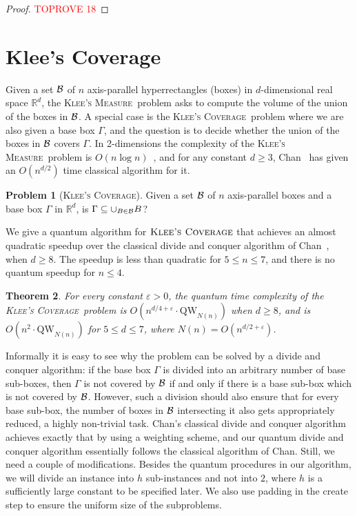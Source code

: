 \documentclass[12pt]{article}
\newcommand{\qw}{\mathrm{QW}}
\newcommand{\R}{\mathbb{R}}
\newcommand{\KCf}{\textsc{Klee's Coverage}}
\newcommand{\KMf}{\textsc{Klee's Measure}}
\newtheorem{theorem}{Theorem}
\theoremstyle{definition}
\newtheorem{problem}[theorem]{Problem}
\begin{document}
\begin{proof}\textcolor{red}{TOPROVE 18}\end{proof}

\section{Klee's Coverage}
\label{sec:klee}

Given a set $\cal B$ of $n$ axis-parallel hyperrectangles (boxes) in $d$-dimensional real space $\R^d$, the \KMf \ problem asks to compute the volume of the union of the boxes in $\cal B$. A special case is the \KCf \ problem where we are also given a base box $\Gamma$, and the question is to decide whether the union of the boxes in $\cal B$ covers $\Gamma$. 
In 2-dimensions the complexity of the \KMf \  problem is $O(n \log n)$~\cite{Klee77}, and for any constant $d \geq 3$,
Chan~\cite{Chan13} has given an $O(n^{d/2})$ time classical algorithm for it.


\begin{problem}[\KCf ]
Given a set $\cal B$ of $n$ axis-parallel boxes and a base box $\Gamma$ in $\R^d$, is $\Gamma \subseteq \cup_{B \in {\cal B}} B$?
\end{problem}

We give a quantum algorithm for $\KCf$ that achieves an almost quadratic speedup over the classical divide and conquer algorithm of Chan~\cite{Chan13}, when $d \geq 8$.
The speedup is less than quadratic for $5 \leq n \leq 7$, and there is no quantum speedup for $n \leq 4$.

\begin{theorem}
\label{thm:klee}
For every constant $\varepsilon > 0$, the quantum time complexity of the \KCf \ problem is $O(n^{d/4 + \varepsilon} \cdot \qw_{N(n)})$ when $d \geq 8$, and is $O(n^2 \cdot \qw_{N(n)})$ for $5 \leq d \leq 7$, where $N(n) = O(n^{d/2 + \varepsilon})$.
\end{theorem}

Informally it is easy to see why the problem can be solved by a divide and conquer algorithm: if the base box $\Gamma$ is divided into an arbitrary number of base sub-boxes, then $\Gamma$ is not covered by ${\cal B}$ if and only if there is a base sub-box which is not covered by ${\cal B}$. However, such a division should also ensure that for every base sub-box, the number of boxes in ${\cal B}$ intersecting it also gets appropriately reduced, a highly non-trivial task. Chan's classical divide and conquer algorithm achieves exactly that by using a weighting scheme, and our quantum divide and conquer algorithm essentially follows the classical algorithm of Chan. Still, we need a couple of modifications.
Besides the quantum procedures in our algorithm, we will divide an instance into $h$ sub-instances and not into $2$, where $h$ is a sufficiently large constant to be specified later. We also use padding in the create step to ensure the uniform size of the subproblems. 
\end{document}
